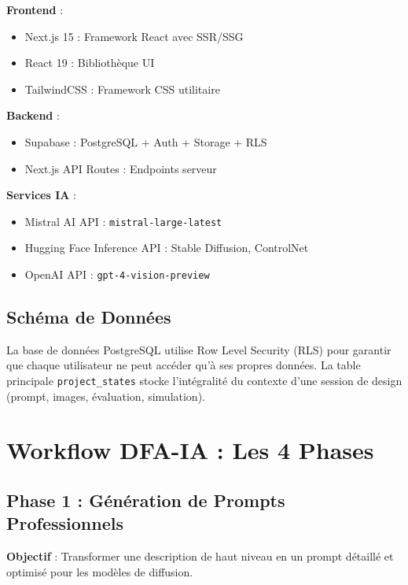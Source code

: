 \documentclass[12pt,a4paper]{article}
\begin{document}
\textbf{Frontend} :
\begin{itemize}
    \item Next.js 15 : Framework React avec SSR/SSG
    \item React 19 : Bibliothèque UI
    \item TailwindCSS : Framework CSS utilitaire
\end{itemize}

\textbf{Backend} :
\begin{itemize}
    \item Supabase : PostgreSQL + Auth + Storage + RLS
    \item Next.js API Routes : Endpoints serveur
\end{itemize}

\textbf{Services IA} :
\begin{itemize}
    \item Mistral AI API : \texttt{mistral-large-latest}
    \item Hugging Face Inference API : Stable Diffusion, ControlNet
    \item OpenAI API : \texttt{gpt-4-vision-preview}
\end{itemize}

\subsection{Schéma de Données}

La base de données PostgreSQL utilise Row Level Security (RLS) pour garantir que chaque utilisateur ne peut accéder qu'à ses propres données. La table principale \texttt{project\_states} stocke l'intégralité du contexte d'une session de design (prompt, images, évaluation, simulation).

\section{Workflow DFA-IA : Les 4 Phases}

\subsection{Phase 1 : Génération de Prompts Professionnels}

\textbf{Objectif} : Transformer une description de haut niveau en un prompt détaillé et optimisé pour les modèles de diffusion.
\end{document}
